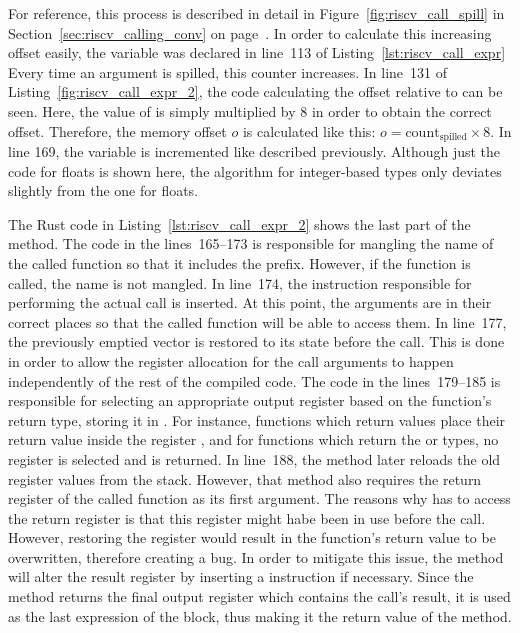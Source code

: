 For reference, this process is described in detail in Figure~\ref{fig:riscv_call_spill} in Section~\ref{sec:riscv_calling_conv} on page~\pageref{sec:riscv_calling_conv}.
In order to calculate this increasing offset easily, the  variable was declared in line~113 of Listing~\ref{lst:riscv_call_expr}
Every time an argument is spilled, this counter increases.
In line~131 of Listing~\ref{fig:riscv_call_expr_2}, the code calculating the offset relative to  can be seen.
Here, the value of  is simply multiplied by 8 in order to obtain the correct offset.
Therefore, the memory offset $o$ is calculated like this: $o = \text{count}_\text{spilled} \times 8$.
In line 169, the  variable is incremented like described previously.
Although just the code for floats is shown here, the algorithm for integer-based types only deviates slightly from the one for floats.

The Rust code in Listing~\ref{lst:riscv_call_expr_2} shows the last part of the method.%
%
%
The code in the lines~165--173 is responsible for mangling the name of the called function so that it includes the  prefix.
However, if the  function is called, the name is not mangled.
In line~174, the  instruction responsible for performing the actual call is inserted.
At this point, the arguments are in their correct places so that the called function will be able to access them.
In line~177, the previously emptied  vector is restored to its state before the call.
This is done in order to allow the register allocation for the call arguments to happen independently of the rest of the compiled code.
The code in the lines~179--185 is responsible for selecting an appropriate output register based on the function's return type, storing it in .
For instance, functions which return  values place their return value inside the register , and for functions which return the \qVerb{()} or \qVerb{!} types, no register is selected and  is returned.
In line~188, the method  later reloads the old register values from the stack.
However, that method also requires the return register of the called function as its first argument.
The reasons why  has to access the return register is that this register might habe been in use before the call.
However, restoring the register would result in the function's return value to be overwritten, therefore creating a bug.
In order to mitigate this issue, the method will alter the result register by inserting a  instruction if necessary.
Since the method returns the final output register which contains the call's result, it is used as the last expression of the block,
thus making it the return value of the  method.

